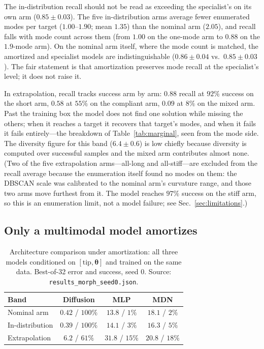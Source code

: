 \documentclass[robotics,article,submit,moreauthors]{Definitions/mdpi}
\begin{document}
The in-distribution recall should not be read as exceeding the
specialist's on its own arm ($0.85\pm0.03$). The five in-distribution
arms average fewer enumerated modes per target ($1.00$--$1.90$; mean
$1.35$) than the nominal arm ($2.05$), and recall falls with mode count
across them (from $1.00$ on the one-mode arm to $0.88$ on the $1.9$-mode
arm). On the nominal arm itself, where the mode count is matched, the
amortized and specialist models are indistinguishable ($0.86\pm0.04$ vs.\
$0.85\pm0.03$). The fair statement is that amortization preserves mode
recall at the specialist's level; it does not raise it.

In extrapolation, recall tracks success arm by arm: $0.88$ recall at
$92\%$ success on the short arm, $0.58$ at $55\%$ on the compliant arm,
$0.09$ at $8\%$ on the mixed arm. Past the training box the model does not
find one solution while missing the others; when it reaches a target it
recovers that target's modes, and when it fails it fails entirely---the
breakdown of Table~\ref{tab:marginal}, seen from the mode side. The
diversity figure for this band ($6.4\pm0.6$) is low chiefly because
diversity is computed over successful samples and the mixed arm
contributes almost none. (Two of the five extrapolation arms---all-long
and all-stiff---are excluded from the recall average because the
enumeration itself found no modes on them: the DBSCAN scale was calibrated
to the nominal arm's curvature range, and those two arms move furthest
from it. The model reaches $97\%$ success on the stiff arm, so this is an
enumeration limit, not a model failure; see Sec.~\ref{sec:limitations}.)

\subsection{Only a multimodal model amortizes}
\label{sec:arch}

\begin{table}[H]
\caption{Architecture comparison under amortization: all three models
conditioned on $[\text{tip},\boldsymbol{\theta}]$ and trained on the same
data. Best-of-32 error and success, seed 0. Source:
\texttt{results\_morph\_seed0.json}.}
\label{tab:arch}
\begin{tabularx}{\textwidth}{lCCC}
\toprule
\textbf{Band} & \textbf{Diffusion} & \textbf{MLP} & \textbf{MDN} \\
\midrule
Nominal arm     & $\mathbf{0.42}$ / $100\%$ & $13.8$ / $1\%$ & $18.1$ / $2\%$ \\
In-distribution & $\mathbf{0.39}$ / $100\%$ & $14.1$ / $3\%$ & $16.3$ / $5\%$ \\
Extrapolation   & $\mathbf{6.2}$ / $61\%$ & $31.8$ / $15\%$ & $20.8$ / $18\%$ \\
\bottomrule
\end{tabularx}
\end{table}
\end{document}
